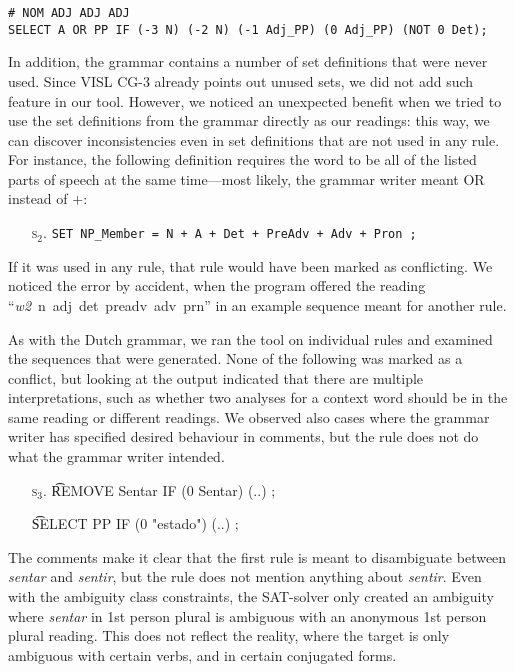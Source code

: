 {{\begin{itemize}
\begin{verbatim}
# NOM ADJ ADJ ADJ
SELECT A OR PP IF (-3 N) (-2 N) (-1 Adj_PP) (0 Adj_PP) (NOT 0 Det);
\end{verbatim}
\end{itemize}


In addition, the grammar contains a number of set definitions that were never
used. Since VISL CG-3 already points out unused sets, we did not add such
feature in our tool. However, we noticed an unexpected benefit when
we tried to use the set definitions from the grammar directly as our
readings: this way, we can discover inconsistencies even in
set definitions that are not used in any rule.
For instance, the following definition requires the word to be all of
the listed parts of speech at the same time---most likely, the grammar writer meant 
OR instead of +:
\begin{itemize}
\item[\textsc{s$_2$.}] 
\texttt{SET NP\_Member = N + A + Det + PreAdv + Adv + Pron ;}
\end{itemize}

If it was used in any rule, that rule would have been marked as
conflicting. We noticed the error by accident, when the program
offered the reading ``\emph{w2}~n~adj~det~preadv~adv~prn''
in an example sequence meant for another rule.


As with the Dutch grammar, we ran the tool on individual rules and
examined the sequences that were generated. None of the following was
marked as a conflict, but looking at the output indicated that there
are multiple interpretations, such as whether two analyses for a
context word should be in the same reading or different readings.
We observed also cases where the grammar writer has specified desired
behaviour in comments, but the rule does not do what the grammar
writer intended. 

\begin{itemize}
\item[\textsc{s$_3$.}] \t{REMOVE Sentar IF (0 Sentar) (..) ;}
\item[] \t{SELECT PP IF (0 "estado") (..) ;}
\end{itemize}

The comments make it clear that the first rule is meant to disambiguate between \emph{sentar} and \emph{sentir}, but the rule does not mention anything about \emph{sentir}.
Even with the ambiguity class constraints, the SAT-solver only created an ambiguity where \emph{sentar} in 1st person plural is ambiguous with an anonymous 1st person plural reading.
This does not reflect the reality, where the target is only ambiguous with certain verbs, and in certain conjugated forms.

}}
